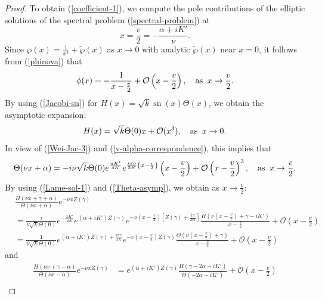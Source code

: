 \documentclass[10pt,a4paper]{amsart}
\DeclareMathOperator{\sn}{sn}
\begin{document}
\begin{proof}
To obtain (\ref{coefficient-1}), we compute the pole contributions of the elliptic solutions of the spectral problem (\ref{spectral-problem}) at 
$$
x = \frac{v}{2} = -\frac{\alpha + i K'}{\nu}.
$$ 
Since $\wp(x) = \frac{1}{x^2} + \tilde{\wp}(x)$ as $x \to 0$ with analytic  $\tilde{\wp}(x)$ near $x = 0$, it follows from (\ref{phinova}) that 
\begin{equation}
\label{phi-asymp}
\phi(x) = -\frac{1}{x - \frac{v}{2}} + \mathcal{O}\left(x - \frac{v}{2} \right), \quad \mbox{\rm as} \;\; x \to \frac{v}{2}.
\end{equation}
By using (\ref{Jacobi-sn}) for $H(x) = \sqrt{k} \sn(x) \Theta(x)$, we
obtain the asymptotic expansion:
\begin{equation*}
H(x) = \sqrt{k} \Theta(0) x + \mathcal{O}(x^3), \quad \mbox{\rm as} \;\; x \to 0.
\end{equation*}
In view of (\ref{Wei-Jac-3}) and (\ref{v-alpha-correspondence}), this implies that 
\begin{equation}
\label{Theta-asymp}
\Theta(\nu x + \alpha) = -i \nu \sqrt{k} \Theta(0) e^{\frac{\pi K'}{4K}} e^{\frac{i \pi \nu}{2K} \left(x - \frac{v}{2} \right)} \left( x - \frac{v}{2} \right) + \mathcal{O}\left(x - \frac{v}{2} \right)^3, \quad \mbox{\rm as} \;\; x \to \frac{v}{2}.
\end{equation}
By using (\ref{Lame-sol-1}) and (\ref{Theta-asymp}), we obtain as $x \to \frac{v}{2}$:
\begin{align*}
& \frac{H(\nu x + \gamma + \alpha)}{\Theta(\nu x + \alpha)} e^{-\nu x Z(\gamma)}\\
&= \frac{i}{\nu \sqrt{k} \Theta(0)} e^{-\frac{\pi K'}{4K}} 
e^{(\alpha + iK') Z(\gamma)} e^{-\nu \left(x - \frac{v}{2} \right) \left[ Z(\gamma) + \frac{i \pi}{2K}\right]}
\frac{H\left(\nu\left(x - \frac{v}{2}\right) + \gamma - iK' \right)}{x - \frac{v}{2}} + \mathcal{O}\left(x - \frac{v}{2}\right) \\
&= \frac{1}{\nu \sqrt{k} \Theta(0)} 
e^{(\alpha + iK') Z(\gamma) + \frac{i \pi \gamma}{2K}} e^{-\nu \left(x - \frac{v}{2} \right) Z(\gamma)}
\frac{\Theta\left(\nu\left(x - \frac{v}{2}\right) + \gamma \right)}{x - \frac{v}{2}} + \mathcal{O}\left(x - \frac{v}{2}\right)
\end{align*}
and
\begin{align*}
\frac{H(\nu x + \gamma - \alpha)}{\Theta(\nu x - \alpha)} e^{-\nu x Z(\gamma)}
&= e^{(\alpha + iK') Z(\gamma)} \frac{H(\gamma - 2 \alpha - iK')}{\Theta(-2\alpha - iK')} + \mathcal{O}\left(x - \frac{v}{2}\right) \\

\end{align*}
\end{proof}
\end{document}
